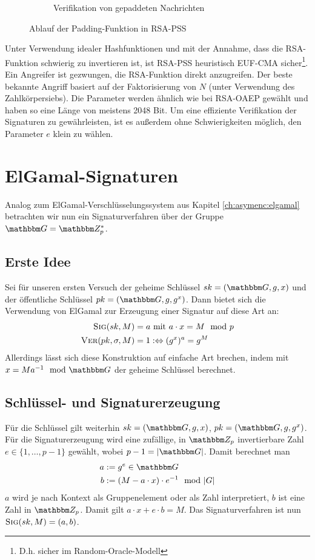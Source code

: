 \begin{figure}[h]
\begin{subfigure}[b]{.45\textwidth}
    \caption{Verifikation von gepaddeten Nachrichten}
    \label{fig:pss-vfy}
  \end{subfigure}
  \caption{Ablauf der Padding-Funktion in RSA-PSS}
\end{figure}

Unter Verwendung idealer Hashfunktionen und mit der Annahme, dass die
RSA-Funktion schwierig zu invertieren ist, ist RSA-PSS heuristisch
EUF-CMA sicher\footnote{D.h. sicher im Random-Oracle-Modell}. Ein
Angreifer ist gezwungen, die RSA-Funktion direkt anzugreifen. Der beste
bekannte Angriff basiert auf der Faktorisierung von $N$ (unter
Verwendung des Zahlkörpersiebs). Die Parameter werden ähnlich wie bei
RSA-OAEP gewählt und haben so eine Länge von meistens 2048 Bit. Um eine
effiziente Verifikation der Signaturen zu gewährleisten, ist es außerdem
ohne Schwierigkeiten möglich, den Parameter $e$ klein zu wählen.

\section{ElGamal-Signaturen}\indexElGamal 
Analog zum ElGamal-Verschlüsselungssystem aus Kapitel
\ref{ch:asymenc:elgamal} betrachten wir nun ein Signaturverfahren über
der Gruppe $\G = \Z{p}^*$.
\subsection{Erste Idee} 
Sei für unseren ersten Versuch der geheime
Schlüssel $\skey = (\G, g, x)$ und der öffentliche Schlüssel $\pkey =
(\G, g, g^x)$. Dann bietet sich die Verwendung von ElGamal zur Erzeugung
einer Signatur auf diese Art an:
\begin{align*} 
  \textsc{Sig}(sk,M) &= a \text{ mit } a \cdot x = M \mod p \\  
  \textsc{Ver}(pk,\sigma,M) &= 1 :\Leftrightarrow (g^x)^a =  g^M
\end{align*} 
Allerdings lässt sich diese Konstruktion auf einfache Art
brechen, indem mit $x = M a^{-1} \mod \G$ der geheime Schlüssel
berechnet.
\subsection{Schlüssel- und Signaturerzeugung} 
Für die Schlüssel gilt weiterhin $\skey = (\G, g, x)$, $\pkey = (\G, g,
g^x)$.  Für die Signaturerzeugung wird eine zufällige, in $\Z{p}$
invertierbare Zahl $e \in \{1, \dots, p - 1\}$ gewählt, wobei
$p-1=|\G|$. Damit berechnet man
\begin{align*} 
  a &:= g^e \in \G\\ 
  b &:= (M - a \cdot x) \cdot e^{-1} \mod |G|
\end{align*} 
$a$ wird je nach Kontext als Gruppenelement oder als Zahl interpretiert,
$b$ ist eine Zahl in $\Z{p}$.  Damit gilt $a \cdot x + e \cdot b =
M$. Das Signaturverfahren ist nun $\textsc{Sig}(sk,M) = (a, b)$.

